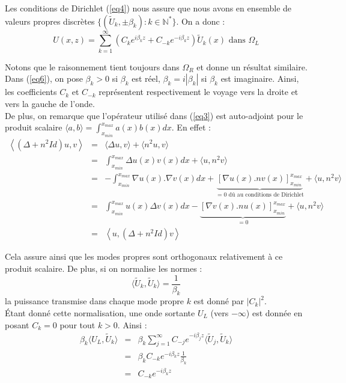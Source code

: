 \documentclass{article}
\begin{document}
Les conditions de Dirichlet (\ref{eq4}) nous assure que nous avons en ensemble de valeurs propres discrètes $\{(\tilde{U}_k,\pm\beta_k):k\in\mathbb{N}^*\}$. On a donc :
\begin{equation}\label{eq6} U(x,z)=\sum_{k=1}^\infty \left(C_ke^{i\beta_k z}+C_{-k}e^{-i\beta_k z}\right) \tilde{U}_k(x) \text{ dans } \Omega_L \end{equation}

Notons que le raisonnement tient toujours dans $\Omega_R$ et donne un résultat similaire.\\
Dans (\ref{eq6}), on pose $\beta_k>0$ si $\beta_k$ est réel, $\beta_k=i|\beta_k|$ si $\beta_k$ est imaginaire. Ainsi, les coefficients $C_k$ et $C_{-k}$ représentent respectivement le voyage vers la droite et vers la gauche de l'onde.\\
De plus, on remarque que l'opérateur utilisé dans (\ref{eq3}) est auto-adjoint pour le produit scalaire $\langle a,b\rangle = \int_{x_{min}}^{x_{max}} a(x)b(x)dx$. En effet :
\begin{eqnarray*}
\left\langle (\Delta +n^2 Id)u,v\right\rangle&=&\langle \Delta u,v\rangle + \langle n^2u,v\rangle \\
					&=&\int_{x_{min}}^{x_{max}} \Delta u(x) v(x) dx + \langle u,n^2 v \rangle \\
					&=&-\int_{x_{min}}^{x_{max}} \nabla u(x). \nabla v(x) dx + \underbrace{\left[\nabla u(x).n v(x)\right]_{x_{min}}^{x_{max}}}_{=0 \text{ dû au conditions de Dirichlet}}+ \langle u,n^2 v \rangle \\
					&=& \int_{x_{min}}^{x_{max}} u(x) \Delta v(x) dx - \underbrace{\left[\nabla v(x).n u(x)\right]_{x_{min}}^{x_{max}}}_{=0} + \langle u,n^2 v \rangle \\
					&=& \left\langle u,(\Delta +n^2 Id)v\right\rangle
\end{eqnarray*}

Cela assure ainsi que les modes propres sont orthogonaux relativement à ce produit scalaire. De plus, si on normalise les normes :
\begin{equation} \label{eq7} \langle \tilde{U}_k,\tilde{U}_k\rangle = \frac{1}{\beta_k} \end{equation}
la puissance transmise dans chaque mode propre $k$ est donné par $|C_k|^2$.\\
Étant donné cette normalisation, une onde sortante $U_L$ (vers $-\infty$) est donnée en posant $C_k=0$ pour tout $k>0$. Ainsi :
\begin{eqnarray*}
\beta_k\langle U_L,\tilde{U}_k\rangle &=&\beta_k\sum_{j=1}^\infty C_{-j}e^{-i\beta_j z}\langle \tilde{U}_j,\tilde{U}_k \rangle \\
				      &=&\beta_k C_{-k} e^{-i\beta_k z} \frac{1}{\beta_k}\\
				      &=&C_{-k} e^{-i\beta_k z}
\end{eqnarray*}
\end{document}
